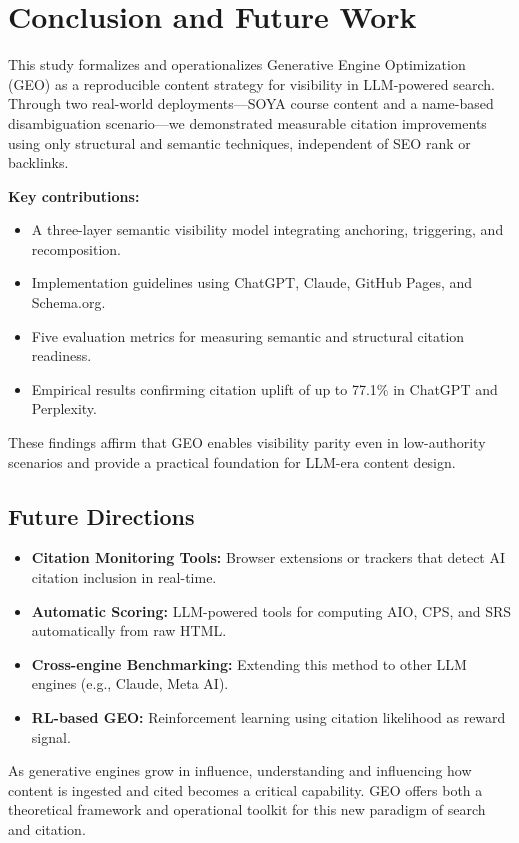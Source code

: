 \section{Conclusion and Future Work}

This study formalizes and operationalizes Generative Engine Optimization (GEO) as a reproducible content strategy for visibility in LLM-powered search. Through two real-world deployments---SOYA course content and a name-based disambiguation scenario---we demonstrated measurable citation improvements using only structural and semantic techniques, independent of SEO rank or backlinks.

\textbf{Key contributions:}
\begin{itemize}
  \item A three-layer semantic visibility model integrating anchoring, triggering, and recomposition.
  \item Implementation guidelines using ChatGPT, Claude, GitHub Pages, and Schema.org.
  \item Five evaluation metrics for measuring semantic and structural citation readiness.
  \item Empirical results confirming citation uplift of up to 77.1\% in ChatGPT and Perplexity.
\end{itemize}

These findings affirm that GEO enables visibility parity even in low-authority scenarios and provide a practical foundation for LLM-era content design.

\subsection{Future Directions}
\begin{itemize}
  \item \textbf{Citation Monitoring Tools:} Browser extensions or trackers that detect AI citation inclusion in real-time.
  \item \textbf{Automatic Scoring:} LLM-powered tools for computing AIO, CPS, and SRS automatically from raw HTML.
  \item \textbf{Cross-engine Benchmarking:} Extending this method to other LLM engines (e.g., Claude, Meta AI).
  \item \textbf{RL-based GEO:} Reinforcement learning using citation likelihood as reward signal.
\end{itemize}

As generative engines grow in influence, understanding and influencing how content is ingested and cited becomes a critical capability. GEO offers both a theoretical framework and operational toolkit for this new paradigm of search and citation.
